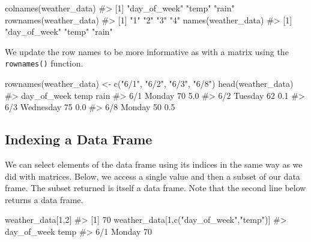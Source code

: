 \documentclass[
  letterpaper,
]{krantz}
\makeatletter
\newenvironment{Shaded}{\begin{snugshade}}{\end{snugshade}}
\newcommand{\CommentTok}[1]{\textcolor[rgb]{0.37,0.37,0.37}{#1}}
\newcommand{\DecValTok}[1]{\textcolor[rgb]{0.68,0.00,0.00}{#1}}
\newcommand{\FunctionTok}[1]{\textcolor[rgb]{0.28,0.35,0.67}{#1}}
\newcommand{\NormalTok}[1]{\textcolor[rgb]{0.00,0.23,0.31}{#1}}
\newcommand{\OtherTok}[1]{\textcolor[rgb]{0.00,0.23,0.31}{#1}}
\newcommand{\StringTok}[1]{\textcolor[rgb]{0.13,0.47,0.30}{#1}}
\newenvironment{kframe}{%
\medskip{}
\setlength{\fboxsep}{.8em}
 \def\at@end@of@kframe{}%
 \ifinner\ifhmode%
  \def\at@end@of@kframe{\end{minipage}}%
  \begin{minipage}{\columnwidth}%
 \fi\fi%
 \def\FrameCommand##1{\hskip\@totalleftmargin \hskip-\fboxsep
 \colorbox{shadecolor}{##1}\hskip-\fboxsep
     \hskip-\linewidth \hskip-\@totalleftmargin \hskip\columnwidth}%
 \MakeFramed {\advance\hsize-\width
   \@totalleftmargin\z@ \linewidth\hsize
   \@setminipage}}%
 {\par\unskip\endMakeFramed%
 \at@end@of@kframe}
\renewenvironment{Shaded}{\begin{kframe}}{\end{kframe}}
\makeatother
\begin{document}
\begin{Shaded}
\begin{Highlighting}[]
\FunctionTok{colnames}\NormalTok{(weather\_data)}
\CommentTok{\#\textgreater{} [1] "day\_of\_week" "temp"        "rain"}
\FunctionTok{rownames}\NormalTok{(weather\_data)}
\CommentTok{\#\textgreater{} [1] "1" "2" "3" "4"}
\FunctionTok{names}\NormalTok{(weather\_data)}
\CommentTok{\#\textgreater{} [1] "day\_of\_week" "temp"        "rain"}
\end{Highlighting}
\end{Shaded}

We update the row names to be more informative as with a matrix using
the \texttt{rownames()} function.

\begin{Shaded}
\begin{Highlighting}[]
\FunctionTok{rownames}\NormalTok{(weather\_data) }\OtherTok{\textless{}{-}} \FunctionTok{c}\NormalTok{(}\StringTok{"6/1"}\NormalTok{, }\StringTok{"6/2"}\NormalTok{, }\StringTok{"6/3"}\NormalTok{, }\StringTok{"6/8"}\NormalTok{)}
\FunctionTok{head}\NormalTok{(weather\_data)}
\CommentTok{\#\textgreater{}     day\_of\_week temp rain}
\CommentTok{\#\textgreater{} 6/1      Monday   70  5.0}
\CommentTok{\#\textgreater{} 6/2     Tuesday   62  0.1}
\CommentTok{\#\textgreater{} 6/3   Wednesday   75  0.0}
\CommentTok{\#\textgreater{} 6/8      Monday   50  0.5}
\end{Highlighting}
\end{Shaded}

\subsection{Indexing a Data Frame}\label{indexing-a-data-frame}

We can select elements of the data frame using its indices in the same
way as we did with matrices. Below, we access a single value and then a
subset of our data frame. The subset returned is itself a data frame.
Note that the second line below returns a data frame.

\begin{Shaded}
\begin{Highlighting}[]
\NormalTok{weather\_data[}\DecValTok{1}\NormalTok{,}\DecValTok{2}\NormalTok{]}
\CommentTok{\#\textgreater{} [1] 70}
\NormalTok{weather\_data[}\DecValTok{1}\NormalTok{,}\FunctionTok{c}\NormalTok{(}\StringTok{"day\_of\_week"}\NormalTok{,}\StringTok{"temp"}\NormalTok{)]}
\CommentTok{\#\textgreater{}     day\_of\_week temp}
\CommentTok{\#\textgreater{} 6/1      Monday   70}
\end{Highlighting}
\end{Shaded}
\end{document}

